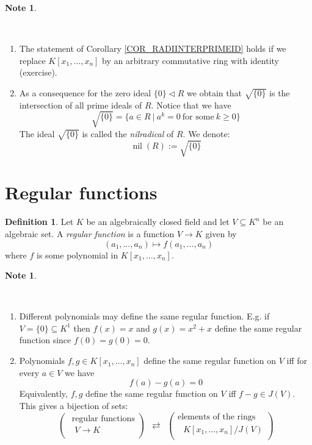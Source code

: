 \documentclass[12pt, letterpaper, oneside]{article}
\theoremstyle{plain}
\theoremstyle{definition}
\newtheorem{definition}[theorem]{Definition}
\newtheorem{note}[theorem]{Note}
\newcommand{\nil}{\operatorname{nil}}
\newcommand{\benu}{\begin{enumerate}}
\newcommand{\eenu}{\end{enumerate}}
\newcommand{\vs}{\vskip 5mm}
\newcommand{\isep}[1][0]{\setlength{\itemsep}{#1 mm}}
\begin{document}
\vs\vs

\begin{note} \ 
\label{NOTE_NILRADICAL}
\vskip -13mm

\ 
\benu
\isep[5]
\item The statement of Corollary \ref{COR_RADIINTERPRIMEID} holds if we replace 
$K[x_{1}, \dots, x_{n}]$ by an arbitrary commutative ring with identity (exercise). 

\item As a consequence  for the zero ideal $\{0\}\lhd R$ we obtain that 
$\sqrt{\{0\}}$ is the intersection of all prime ideals of $R$. Notice that we have 
$$\sqrt{\{0\}} = \{a\in R \ | \ a^{k} = 0 \ \text{for some} \ k\geq 0\}$$
The ideal $\sqrt{\{0\}}$ is called the \emph{nilradical} of $R$. We denote:
$$\nil(R):= \sqrt{\{0\}}$$
\eenu
\end{note}








\newpage
\section{Regular functions}
\label{SEC_REGFUNCTIONS}

\begin{definition}
Let $K$ be an algebraically closed field and let $V\subseteq K^{n}$  be an 
algebraic set. A \emph{regular function}  is a function $V \to K$ given by 
 $$(a_{1}, \dots, a_{n}) \mapsto f(a_{1}, \dots, a_{n})$$
 where $f$ is some polynomial in $K[x_{1}, \dots, x_{n}]$. 
\end{definition}


\vs\vs


\begin{note}\ 
\label{NOTE_REGFUNCTIONS}
\vskip -13mm

\ 
\benu
\isep[5]
\item Different polynomials may define the same regular function. E.g. 
if $V = \{0\} \subseteq K^{1}$ then $f(x) = x$ and $g(x) = x^{2}+x$  define 
the same regular function since $f(0) = g(0) = 0$. 
\item Polynomials $f, g\in K[x_{1}, \dots, x_{n}]$ define the same regular function on $V$
iff  for every $a\in V$ we have 
$$f(a)-g(a) = 0$$
Equivalently, $f, g$ define the same regular function on $V$ iff $f-g \in J(V)$. This gives a bijection 
of sets:
$$
\begin{pmatrix}
\text{ regular functions} \\[1mm]
\text{  $V \to K$} \\
\end{pmatrix}
\ \ \rightleftarrows \ \ 
\begin{pmatrix}
\text{elements of the rings} \\[1mm]
\text{ $K[x_{1}, \dots, x_{n}]/J(V)$} \\
\end{pmatrix}
$$

\eenu
\end{note}
\end{document}
